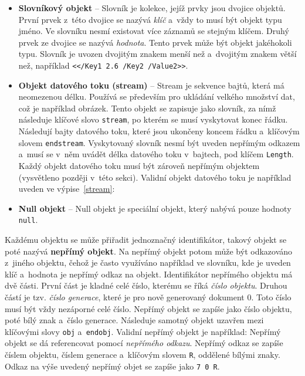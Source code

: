 \begin{itemize}
    \item \textbf{Slovníkový objekt} -- Slovník je kolekce, jejíž prvky jsou
    dvojice objektů. První prvek z~této dvojice se nazývá \emph{klíč} a~vždy to 
    musí být objekt typu jméno. Ve slovníku nesmí existovat více záznamů se
    stejným klíčem. Druhý prvek ze dvojice se nazývá \emph{hodnota}.
    Tento prvek může být objekt jakéhokoli typu. Slovník je uvozen dvojitým znakem
    menší než a~dvojitým znakem větší než, například
    \texttt{<</Key1 2.6 /Key2 /Value2>>}.

    \item \textbf{Objekt datového toku (stream)} -- Stream je sekvence bajtů, 
    která má neomezenou délku. Používá se především pro ukládání velkého množství
    dat, což je například obrázek. Tento objekt se zapisuje jako slovník, za nímž
    následuje klíčové slovo \texttt{stream}, po kterém se musí vyskytovat konec
    řádku. Následují bajty datového toku, které jsou ukončeny koncem řádku
    a~klíčovým slovem \texttt{endstream}. Vyskytovaný slovník nesmí být uveden
    nepřímým odkazem a~musí se v~něm uvádět délka datového toku v~bajtech, pod
    klíčem \texttt{Length}. Každý objekt datového toku musí být zároveň nepřímým
    objektem (vysvětleno později v~této sekci). Validní objekt datového toku je
    například uveden ve výpise~\ref{stream}:

    \item \textbf{Null objekt} -- Null objekt je speciální objekt, který nabývá
    pouze hodnoty \texttt{null}.
\end{itemize}

Každému objektu se může přiřadit jednoznačný identifikátor, takový objekt se poté
nazývá \textbf{nepřímý objekt}. Na nepřímý objekt potom může být odkazováno
z~jiného objektu, čehož je často využíváno například ve slovníku, kde je uveden
klíč a~hodnota je nepřímý odkaz na objekt. Identifikátor nepřímého objektu má dvě
části. První část je kladné celé číslo, kterému se říká \emph{číslo objektu}.
Druhou částí je tzv. \emph{číslo generace}, které je pro nově generovaný dokument
0. Toto číslo musí být vždy nezáporné celé číslo. Nepřímý objekt se zapíše jako
číslo objektu, poté bílý znak a~číslo generace. Následuje samotný objekt uzavřen
mezi klíčovými slovy \texttt{obj} a~\texttt{endobj}. Validní nepřímý objekt je
například:
\noindent Nepřímý objekt se dá referencovat pomocí \emph{nepřímého odkazu}.
Nepřímý odkaz se zapíše číslem objektu, číslem generace a~klíčovým slovem
\texttt{R}, oddělené bílými znaky. Odkaz na výše uvedený nepřímý objet se zapíše
jako \texttt{7 0 R}.



